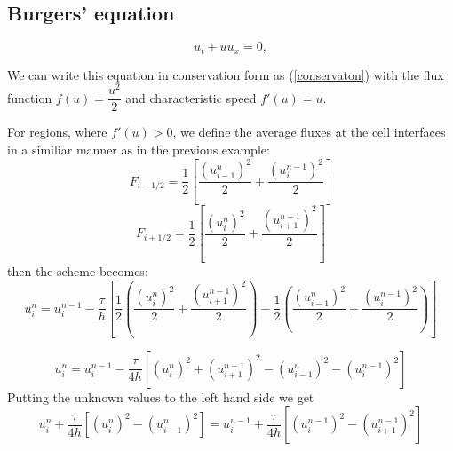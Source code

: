 \documentclass{article}
\begin{document}
\subsection{Burgers' equation}
\begin{equation}
	u_t + uu_x = 0, 
	\label{inviscid}
\end{equation}

We can write this equation in conservation form as (\ref{conservaton}) with the flux function $ f(u) = \dfrac{u^2}{2} $ and characteristic speed $ f'(u) = u $.

For regions, where $ f'(u) > 0 $, we define the average fluxes at the cell interfaces in a similiar manner as in the previous example:
\[
F_{i - 1/2} = \dfrac{1}{2}\left[\frac{(u^n_{i-1})^2}{2} + \frac{(u^{n-1}_{i})^2}{2} \right]
\]
\[
F_{i + 1/2} = \dfrac{1}{2}\left[\frac{(u^n_{i})^2}{2} + \frac{(u^{n-1}_{i+1})^2}{2} \right]
\]
then the scheme becomes:
\[
u_i^{n} = u_i^{n - 1} - \frac{\tau}{h}\left[
\frac{1}{2}\left(\frac{(u^n_{i})^2}{2} + \frac{(u^{n-1}_{i+1})^2}{2} \right)
 - 
\frac{1}{2}\left(\frac{(u^n_{i-1})^2}{2} + \frac{(u^{n-1}_{i})^2}{2}\right)
\right]
\]

\[
u_i^{n} = u_i^{n - 1} - \dfrac{\tau}{4h}\left[
(u^n_{i})^2 + (u^{n-1}_{i+1})^2 
- 
(u^n_{i-1})^2 - (u^{n-1}_{i})^2
\right]
\]
Putting the unknown values to the left hand side we get
\begin{equation}
u_i^{n} + \dfrac{\tau}{4h}\left[(u^n_{i})^2 - (u^n_{i-1})^2\right] = 
u_i^{n - 1} + \dfrac{\tau}{4h}\left[(u^{n-1}_{i})^2 - (u^{n-1}_{i+1})^2\right]
\label{inviscid_0}
\end{equation}


\end{document}
